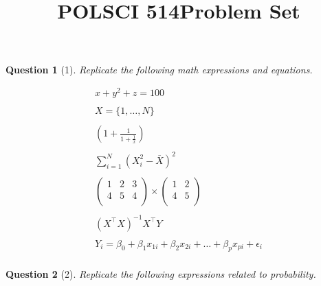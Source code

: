 \documentclass[11pt]{article}
\title{\vspace{-50pt}
\Huge \name
\\\vspace{20pt}
\huge POLSCI 514\hfill Problem Set \hw}
\author{}
\date{}
\theoremstyle{quest}
\newtheorem*{question}{Question}
\begin{document}
\maketitle

\begin{question}[1]
Replicate the following math expressions and equations.
\end{question}

\begin{equation*}
\begin{split}
  x + y^2 + z = 100 \\ 
  \\
  X = \{1, \ldots, N\} \\
  \\
  \left( 1 + \frac{1}{1 + \frac{1}{x}} \right) \\
  \\
  \sum_{i=1}^{N} (X_i^2 - \bar{X})^2 \\ 
  \\
  \begin{pmatrix}
    1 & 2 & 3 \\
    4 & 5 & 4 \\
  \end{pmatrix}
  \times
  \begin{pmatrix}
    1 & 2  \\
    4 & 5  \\
  \end{pmatrix} \\
  \\
  (X^\intercal X)^{-1}X^\intercal Y \\
  \\
  Y_i = \beta_0 + \beta_1 x_{1i} + \beta_2 x_{2i} + \ldots + \beta_p x_{pi} + \epsilon_i \\ 
\end{split}
\end{equation*}

\clearpage
\begin{question}[2]
Replicate the following expressions related to probability.
\end{question}
\end{document}
